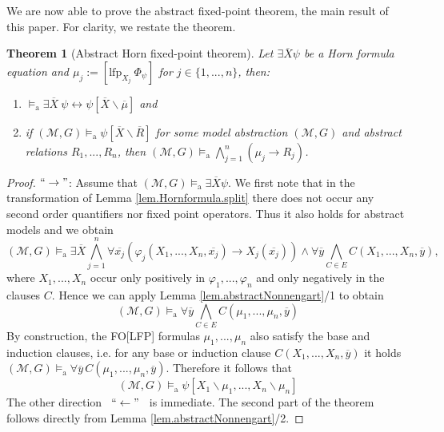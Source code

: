 \documentclass[acmsmall]{acmart}
\theoremstyle{plain}
\newtheorem{theorem}{Theorem}
\theoremstyle{definition}
\newcommand{\calM}{\mathcal{M}}
\newcommand{\mybar}[1]{\overline{#1}}
\newcommand{\impl}{\rightarrow} %
\newcommand{\lfp}{\mathrm{lfp}} %
\newcommand{\modelsa}{\models_\mathrm{a}} %
\begin{document}
We are now able to prove the abstract fixed-point theorem, the main result of this paper. For clarity, we restate the theorem.
\setcounter{theoremRem}{\thetheorem}
\addtocounter{theorem}{-1}
\begin{theorem}[Abstract Horn fixed-point theorem]
	Let $\exists \mybar{X} \psi$ be a Horn formula equation and $\mu_j := [\lfp_{X_j} ~\Phi_{\psi}]$ for $j \in \{1,...,n\}$, then:
	\begin{enumerate}
		\item $\modelsa \exists \mybar{X}  ~\psi \leftrightarrow \psi[\mybar{X}\backslash \mybar{\mu}]$ and
		\item if $(\calM,G) \modelsa \psi[\mybar{X}\backslash \mybar{R}]$ for some model abstraction $(\calM,G)$ and abstract relations $R_1,...,R_n$, then $(\calM,G) \modelsa \bigwedge_{j=1}^n (\mu_j \rightarrow R_j)$.
	\end{enumerate}
\end{theorem}
\begin{proof}%
	$``\rightarrow"$: Assume that $(\calM,G) \modelsa \exists \mybar{X} \psi$. We first note that in the transformation of Lemma \ref{lem.Hornformula.split} there does not occur any second order quantifiers nor fixed point operators. Thus it also holds for abstract models and we obtain
	\[
	(\calM,G) \modelsa \exists \mybar{X} \bigwedge_{j=1}^n \forall \mybar{x_j} (\varphi_j(X_1,...,X_n,\mybar{x_j}) \impl X_j(\mybar{x_j})) \wedge \forall \mybar{y} \bigwedge_{C \in E} C(X_1,...,X_n,\mybar{y}),
	\]
	where $X_1,...,X_n$ occur only positively in $\varphi_1,...,\varphi_n$ and only negatively in the clauses $C$. Hence we can apply Lemma \ref{lem.abstractNonnengart}/1 to obtain
	\[
	(\calM,G) \modelsa \forall \mybar{y} \bigwedge_{C \in E} C(\mu_1,...,\mu_n,\mybar{y})
	\]
	By construction, the FO[LFP] formulas $\mu_1,...,\mu_n$ also satisfy the base and induction clauses, i.e. for any base or induction clause $C(X_1,...,X_n,\mybar{y})$ it holds $(\calM,G) \modelsa \forall \mybar{y}\, C(\mu_1,...,\mu_n,\mybar{y})$. Therefore it follows that
	\[
	(\calM,G) \modelsa \psi[X_1\backslash \mu_1,...,X_n\backslash\mu_n]
	\]
	The other direction ~$``\leftarrow"$~ is immediate.
	The second part of the theorem follows directly from Lemma \ref{lem.abstractNonnengart}/2.
\end{proof}
\setcounter{theorem}{\thetheoremRem}
\end{document}
